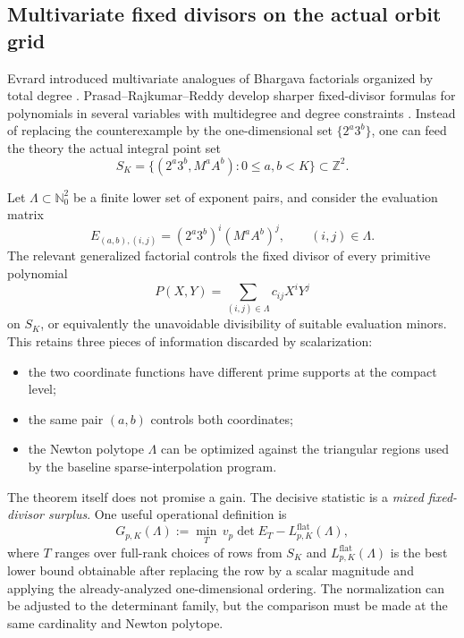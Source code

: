 \documentclass[10pt,letterpaper]{article}
\newcommand{\Z}{\mathbb Z}
\newcommand{\N}{\mathbb N}
\begin{document}
\subsection{Multivariate fixed divisors on the actual orbit grid}

Evrard introduced multivariate analogues of Bhargava factorials organized by total degree
\cite{Evrard2012}.  Prasad--Rajkumar--Reddy develop sharper fixed-divisor formulas for
polynomials in several variables with multidegree and degree constraints
\cite{PrasadRajkumarReddy}.  Instead of replacing the counterexample by the one-dimensional
set \(\{2^a3^b\}\), one can feed the theory the actual integral point set
\[
  S_K=\{(2^a3^b,M^aA^b):0\leq a,b<K\}\subset\Z^2.
\]

Let \(\Lambda\subset\N_0^2\) be a finite lower set of exponent pairs, and consider the
evaluation matrix
\[
  E_{(a,b),(i,j)}=(2^a3^b)^i(M^aA^b)^j,
  \qquad (i,j)\in\Lambda.
\]
The relevant generalized factorial controls the fixed divisor of every primitive polynomial
\[
  P(X,Y)=\sum_{(i,j)\in\Lambda}c_{ij}X^iY^j
\]
on \(S_K\), or equivalently the unavoidable divisibility of suitable evaluation
minors.  This retains three pieces of information discarded by scalarization:

\begin{itemize}
\item the two coordinate functions have different prime supports at the compact level;
\item the same pair \((a,b)\) controls both coordinates;
\item the Newton polytope \(\Lambda\) can be optimized against the triangular regions used by
the baseline sparse-interpolation program.
\end{itemize}

The theorem itself does not promise a gain.  The decisive statistic is a \emph{mixed fixed-
divisor surplus}.  One useful operational definition is
\begin{equation}
  G_{p,K}(\Lambda)
  :=\min_{T}\,v_p\!\det E_T-L^{\mathrm{flat}}_{p,K}(\Lambda),
  \label{eq:mixed-gain}
\end{equation}
where \(T\) ranges over full-rank choices of rows from \(S_K\) and
\(L^{\mathrm{flat}}_{p,K}(\Lambda)\) is the best lower bound obtainable after replacing the
row by a scalar magnitude and applying the already-analyzed one-dimensional ordering.  The
normalization can be adjusted to the determinant family, but the comparison must be made at
the same cardinality and Newton polytope.
\end{document}
